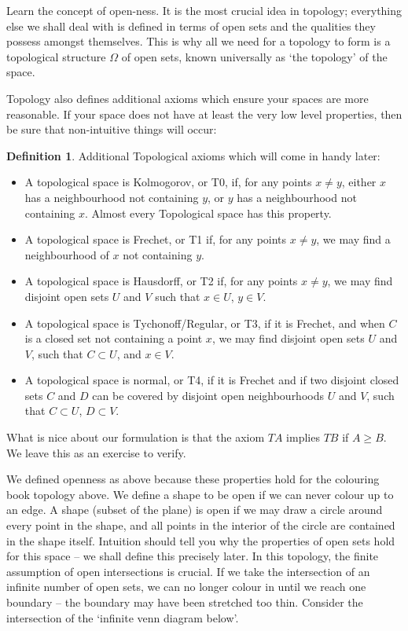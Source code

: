 \documentclass{report}
\theoremstyle{plain}
\theoremstyle{definition}
\newtheorem*{defi}{Definition}
\newenvironment{definition}
    {\begin{samepage}\begin{framed}\begin{defi}}
    {\end{defi}\end{framed}\end{samepage}}
\begin{document}
Learn the concept of open-ness. It is the most crucial idea in topology; everything else we shall deal with is defined in terms of open sets and the qualities they possess amongst themselves. This is why all we need for a topology to form is a topological structure $\Omega$ of open sets, known universally as `the topology' of the space.

Topology also defines additional axioms which ensure your spaces are more reasonable. If your space does not have at least the very low level properties, then be sure that non-intuitive things will occur:

\begin{definition}
Additional Topological axioms which will come in handy later:
%
\begin{itemize}
    \item A topological space is Kolmogorov, or T0, if, for any points $x \neq y$, either $x$ has a neighbourhood not containing $y$, or $y$ has a neighbourhood not containing $x$. Almost every Topological space has this property.
    \item A topological space is Frechet, or T1 if, for any points $x \neq y$, we may find a neighbourhood of $x$ not containing $y$.
    \item A topological space is Hausdorff, or T2 if, for any points $x \neq y$, we may find disjoint open sets $U$ and $V$ such that $x \in U$, $y \in V$.
    \item A topological space is Tychonoff/Regular, or T3, if it is Frechet, and when $C$ is a closed set not containing a point $x$, we may find disjoint open sets $U$ and $V$, such that $C \subset U$, and $x \in V$.
    \item A topological space is normal, or T4, if it is Frechet and if two disjoint closed sets $C$ and $D$ can be covered by disjoint open neighbourhoods $U$ and $V$, such that $C \subset U$, $D \subset V$.
\end{itemize}
%
What is nice about our formulation is that the axiom $TA$ implies $TB$ if $A \geq B$. We leave this as an exercise to verify.
\end{definition}

We defined openness as above because these properties hold for the colouring book topology above. We define a shape to be open if we can never colour up to an edge. A shape (subset of the plane) is open if we may draw a circle around every point in the shape, and all points in the interior of the circle are contained in the shape itself. Intuition should tell you why the properties of open sets hold for this space -- we shall define this precisely later. In this topology, the finite assumption of open intersections is crucial. If we take the intersection of an infinite number of open sets, we can no longer colour in until we reach one boundary -- the boundary may have been stretched too thin. Consider the intersection of the `infinite venn diagram below'.
\end{document}
